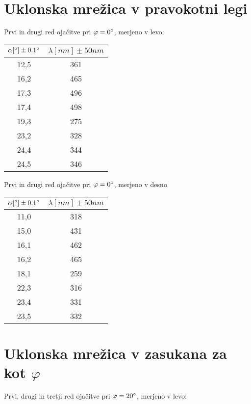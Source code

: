 \documentclass[a4paper]{report}
\begin{document}
\section*{Uklonska mrežica v pravokotni legi}

Prvi in drugi red ojačitve pri $\varphi = 0 \degree$, merjeno v levo:


\begin{center}
  \begin{tabular}{|c|c|}
  \hline
    $\alpha [\degree] \pm 0.1 \degree$ & $\lambda [nm] \pm 50nm$\\ 
    \hline
    12,5 &   361\\
    16,2 &   465 \\
    17,3 &   496\\
    17,4 &   498 \\ \hline
    19,3 &   275\\
    23,2 &   328\\
    24,4 &   344\\
    24,5 &   346 \\ \hline
  \end{tabular}
\end{center}

Prvi in drugi red ojačitve pri $\varphi = 0 \degree$, merjeno v desno


\begin{center}
  \begin{tabular}{|c|c|} 
  \hline
    $\alpha [\degree] \pm 0.1\degree $& $\lambda [nm] \pm 50nm$\\ 
    \hline
    11,0 &   318\\
    15,0 &   431\\
    16,1 &   462\\
    16,2 &   465\\\hline
    18,1 &   259\\
    22,3 &   316\\
    23,4 &   331\\
    23,5 &   332 \\ \hline
  \end{tabular}
\end{center}


\newpage
\section*{Uklonska mrežica v zasukana za kot $\varphi$}

Prvi, drugi in tretji red ojačitve pri $\varphi = 20 \degree$, merjeno v levo:
\end{document}
